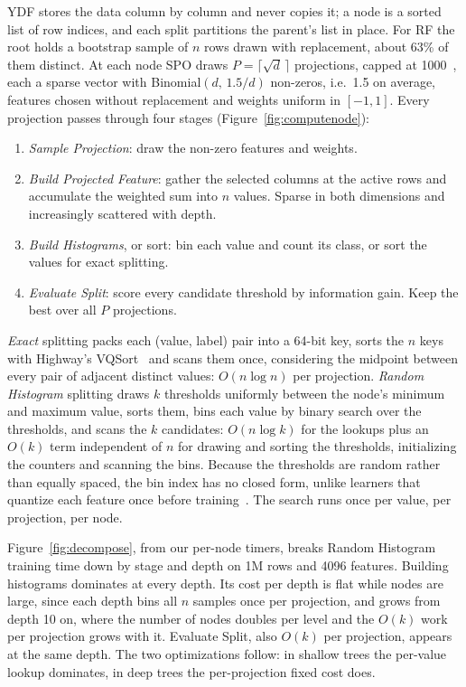 \documentclass[sigconf,anonymous,review]{acmart}
\begin{document}
YDF stores the data column by column and never copies it; a node is a sorted list of row indices, and each split partitions the parent's list in place. For RF the root holds a bootstrap sample of $n$ rows drawn with replacement, about 63\% of them distinct. At each node SPO draws $P=\lceil\sqrt{d}\,\rceil$ projections, capped at 1000~\cite{tomita2020sparse}, each a sparse vector with Binomial$(d,\,1.5/d)$ non-zeros, i.e.\ 1.5 on average, features chosen without replacement and weights uniform in $[-1,1]$. Every projection passes through four stages (Figure~\ref{fig:computenode}):
\begin{enumerate}
\item \emph{Sample Projection}: draw the non-zero features and weights.
\item \emph{Build Projected Feature}: gather the selected columns at the active rows and accumulate the weighted sum into $n$ values. Sparse in both dimensions and increasingly scattered with depth.
\item \emph{Build Histograms}, or sort: bin each value and count its class, or sort the values for exact splitting.
\item \emph{Evaluate Split}: score every candidate threshold by information gain. Keep the best over all $P$ projections.
\end{enumerate}

\emph{Exact} splitting packs each (value, label) pair into a 64-bit key, sorts the $n$ keys with Highway's VQSort~\cite{wassenberg_vectorized_2022} and scans them once, considering the midpoint between every pair of adjacent distinct values: $O(n\log n)$ per projection. \emph{Random Histogram} splitting draws $k$ thresholds uniformly between the node's minimum and maximum value, sorts them, bins each value by binary search over the thresholds, and scans the $k$ candidates: $O(n\log k)$ for the lookups plus an $O(k)$ term independent of $n$ for drawing and sorting the thresholds, initializing the counters and scanning the bins. Because the thresholds are random rather than equally spaced, the bin index has no closed form, unlike learners that quantize each feature once before training~\cite{ke2017lightgbm,prokhorenkova2018catboost}. The search runs once per value, per projection, per node.

Figure~\ref{fig:decompose}, from our per-node timers, breaks Random Histogram training time down by stage and depth on 1M rows and 4096 features. %
Building histograms dominates at every depth. Its cost per depth is flat while nodes are large, since each depth bins all $n$ samples once per projection, and grows from depth 10 on, where the number of nodes doubles per level and the $O(k)$ work per projection grows with it. Evaluate Split, also $O(k)$ per projection, appears at the same depth. The two optimizations follow: in shallow trees the per-value lookup dominates, in deep trees the per-projection fixed cost does.
\end{document}
